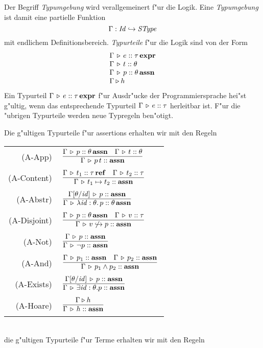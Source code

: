 \documentclass[12pt,a4paper,bigheadings]{scrartcl}
\newcommand{\assn}{\ensuremath{\mathbf{assn}}}
\newcommand{\atype}[1]{#1\,\assn}
\newcommand{\bexpr}{\ensuremath{\mathbf{expr}}}
\newcommand{\etype}[1]{#1\,\bexpr}
\newcommand{\Stype}{\name{SType}}
\renewcommand{\disjoint}[2]{\ensuremath{#2\not\hookrightarrow#1}}
\newcommand{\RN}[1]{\mbox{{\sc (#1)}}}
\begin{document}
Der Begriff {\em Typumgebung} wird verallgemeinert f"ur die Logik. Eine {\em Typumgebung} ist
damit eine partielle Funktion
\[
  \Gamma: \Id \pto \Stype
\]
mit endlichem Definitionsbereich. {\em Typurteile} f"ur die Logik sind von der Form
\[\begin{array}{l}
  \Tj{\Gamma}{e}{\etype{\tau}} \\
  \Tj{\Gamma}{t}{\theta} \\
  \Tj{\Gamma}{p}{\atype{\theta}} \\
  \Tjh{\Gamma}{h}
\end{array}\]
Ein Typurteil $\Tj{\Gamma}{e}{\etype{\tau}}$ f"ur Ausdr"ucke der Programmiersprache hei"st
g"ultig, wenn das entsprechende Typurteil $\Gamma \, \triangleright \, e\mathrel{::}\tau$ herleitbar ist. F"ur die
"ubrigen Typurteile werden neue Typregeln ben"otigt.

Die g"ultigen Typurteile f"ur assertions erhalten wir mit den Regeln \\[3mm]
\begin{tabular}{rl}
  \RN{A-App} & $\regel{\Tj{\Gamma}{p}{\atype{\theta}} \quad \Tj{\Gamma}{t}{\theta}}
                      {\Tj{\Gamma}{\app{p}{t}}{\assn}}$ \\[1mm]
  \RN{A-Content} & $\regel{\Tj{\Gamma}{t_1}{\reftype{\tau}} \quad \Tj{\Gamma}{t_2}{\tau}}
                          {\Tj{\Gamma}{t_1 \mapsto t_2}{\assn}}$ \\[1mm]
  \RN{A-Abstr} & $\regel{\Tj{\Gamma[\theta/\id]}{p}{\assn}}
                        {\Tj{\Gamma}{\abstr{\id:\theta}{p}}{\atype{\theta}}}$ \\[1mm]
  \RN{A-Disjoint} & $\regel{\Tj{\Gamma}{p}{\atype{\theta}} \quad \Tj{\Gamma}{v}{\tau}}
                           {\Tj{\Gamma}{\disjoint{p}{v}}{\assn}}$ \\[1mm]
  \RN{A-Not} & $\regel{\Tj{\Gamma}{p}{\assn}}
                      {\Tj{\Gamma}{\neg p}{\assn}}$ \\[1mm]
  \RN{A-And} & $\regel{\Tj{\Gamma}{p_1}{\assn} \quad \Tj{\Gamma}{p_2}{\assn}}
                      {\Tj{\Gamma}{p_1 \wedge p_2}{\assn}}$ \\[1mm]
  \RN{A-Exists} & $\regel{\Tj{\Gamma[\theta/\id]}{p}{\assn}}
                         {\Tj{\Gamma}{\exists \id:\theta.p}{\assn}}$ \\[1mm]
  \RN{A-Hoare} & $\regel{\Tjh{\Gamma}{h}}
                        {\Tj{\Gamma}{h}{\assn}}$
\end{tabular} \\[3mm]
die g"ultigen Typurteile f"ur Terme erhalten wir mit den Regeln \\[3mm]
\end{document}
